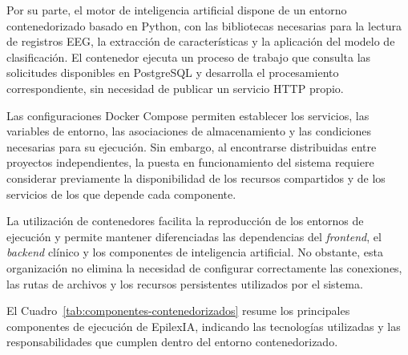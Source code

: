 Por su parte, el motor de inteligencia artificial
dispone de un entorno contenedorizado basado en
Python, con las bibliotecas necesarias para
la lectura de registros EEG, la extracción de
características y la aplicación del modelo de
clasificación. El contenedor ejecuta un proceso de trabajo que
consulta las solicitudes disponibles en PostgreSQL
y desarrolla el procesamiento correspondiente,
sin necesidad de publicar un servicio HTTP propio.

Las configuraciones Docker Compose permiten
establecer los servicios, las variables de entorno,
las asociaciones de almacenamiento y las condiciones
necesarias para su ejecución. Sin embargo, al
encontrarse distribuidas entre proyectos independientes,
la puesta en funcionamiento del sistema requiere
considerar previamente la disponibilidad de los
recursos compartidos y de los servicios de los
que depende cada componente.

La utilización de contenedores facilita la
reproducción de los entornos de ejecución y
permite mantener diferenciadas las dependencias
del \textit{frontend}, el \textit{backend} clínico y los componentes
de inteligencia artificial. No obstante, esta
organización no elimina la necesidad de configurar
correctamente las conexiones, las rutas de archivos
y los recursos persistentes utilizados por el sistema.


El Cuadro~\ref{tab:componentes-contenedorizados} resume los
principales componentes de ejecución de EpilexIA, indicando
las tecnologías utilizadas y las responsabilidades que
cumplen dentro del entorno contenedorizado.

